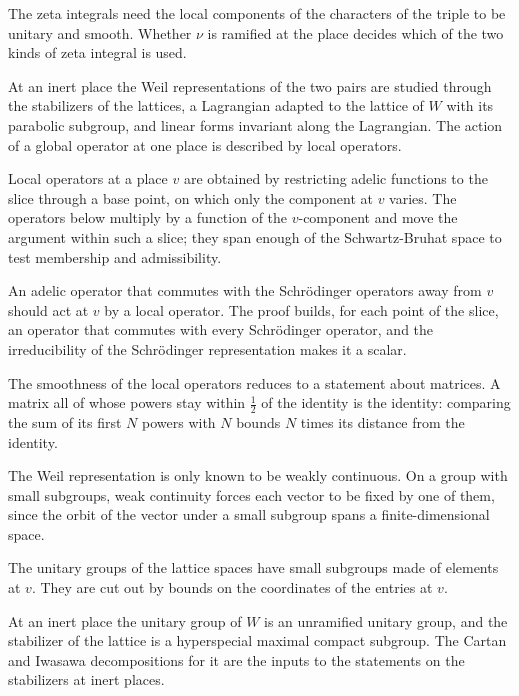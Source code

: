 The zeta integrals need the local components of the characters of the triple to
be unitary and smooth. Whether $\nu$ is ramified at the place decides which of
the two kinds of zeta integral is used.

At an inert place the Weil representations of the two pairs are studied through
the stabilizers of the lattices, a Lagrangian adapted to the lattice of $W$ with
its parabolic subgroup, and linear forms invariant along the Lagrangian. The
action of a global operator at one place is described by local operators.

Local operators at a place $v$ are obtained by restricting adelic functions to
the slice through a base point, on which only the component at $v$ varies. The
operators below multiply by a function of the $v$-component and move the
argument within such a slice; they span enough of the Schwartz-Bruhat space to
test membership and admissibility.

An adelic operator that commutes with the Schrödinger operators away from $v$
should act at $v$ by a local operator. The proof builds, for each point of the
slice, an operator that commutes with every Schrödinger operator, and the
irreducibility of the Schrödinger representation makes it a scalar.

The smoothness of the local operators reduces to a statement about matrices. A
matrix all of whose powers stay within $\tfrac12$ of the identity is the
identity: comparing the sum of its first $N$ powers with $N$ bounds $N$ times its
distance from the identity.

The Weil representation is only known to be weakly continuous. On a group with
small subgroups, weak continuity forces each vector to be fixed by one of them,
since the orbit of the vector under a small subgroup spans a finite-dimensional
space.

The unitary groups of the lattice spaces have small subgroups made of elements
at $v$. They are cut out by bounds on the coordinates of the entries at $v$.

At an inert place the unitary group of $W$ is an unramified unitary group, and
the stabilizer of the lattice is a hyperspecial maximal compact subgroup. The
Cartan and Iwasawa decompositions for it are the inputs to the statements on
the stabilizers at inert places.

